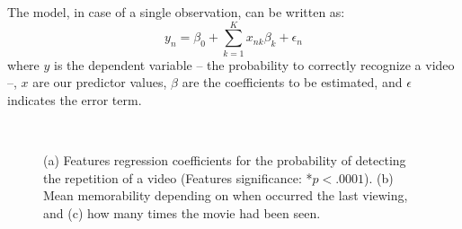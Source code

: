 \documentclass[sigconf]{acmart}
\begin{document}
The model, in case of a single observation, can be written as:
\begin{equation}
	y_n=\beta_0 + \sum\limits_{k=1}^K x_{nk} \beta_k+\epsilon_n
\end{equation}
where $y$ is the dependent variable -- the probability to correctly recognize a video --, $x$ are our predictor values, $\beta$ are the coefficients to be estimated, and $\epsilon$ indicates the error term.

\begin{figure}[!htbp]
	\centering
	\\
	\quad
	\quad
	\caption{\label{fig:logistic_regression}(a) Features regression coefficients for the probability of detecting the repetition of a video (Features significance: *$p<.0001$). (b) Mean memorability depending on when occurred the last viewing, and (c) how many times the movie had been seen.}
\end{figure}
\end{document}
